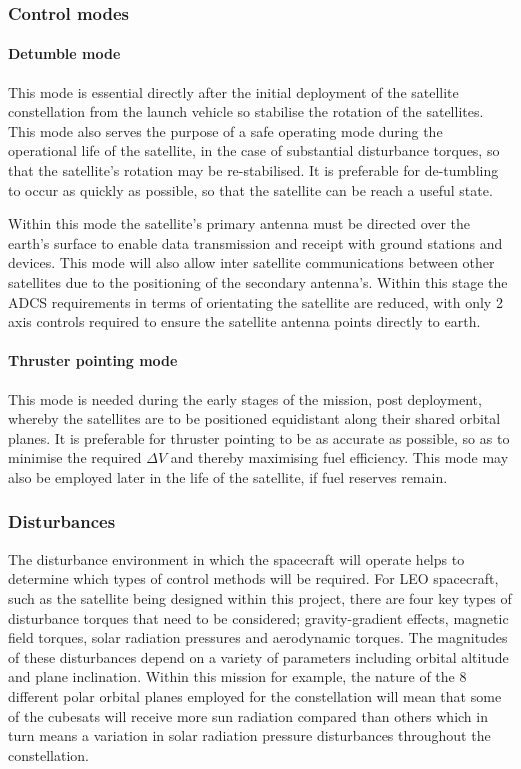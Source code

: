 \subsubsection{Control modes}

\paragraph{Detumble mode}

This mode is essential directly after the initial deployment of the satellite
constellation from the launch vehicle so stabilise the rotation of the satellites.
This mode also serves the purpose of a safe operating mode during the operational
life of the satellite, in the case of substantial disturbance torques, so that
the satellite’s rotation may be re-stabilised. It is preferable for de-tumbling
to occur as quickly as possible, so that the satellite can be reach a useful state.

Within this mode the satellite’s primary antenna must be directed over the earth’s
surface to enable data transmission and receipt with ground stations and devices.
This mode will also allow inter satellite communications between other satellites
due to the positioning of the secondary antenna’s. Within this stage the ADCS
requirements in terms of orientating the satellite are reduced, with only 2 axis
controls required to ensure the satellite antenna points directly to earth.

\paragraph{Thruster pointing mode}

This mode is needed during the early stages of the mission, post deployment,
whereby the satellites are to be positioned equidistant along their shared orbital
planes. It is preferable for thruster pointing to be as accurate as possible, so
as to minimise the required $\Delta V$ and thereby maximising fuel efficiency. This mode
may also be employed later in the life of the satellite, if fuel reserves remain.

\subsubsection{Disturbances}

The disturbance environment in which the spacecraft will operate helps to determine
which types of control methods will be required. For LEO spacecraft, such as the
satellite being designed within this project, there are four key types of
disturbance torques that need to be considered; gravity-gradient effects,
magnetic field torques, solar radiation pressures and aerodynamic torques.
The magnitudes of these disturbances depend on a variety of parameters including
orbital altitude and plane inclination. Within this mission for example,
the nature of the 8 different polar orbital planes employed for the constellation
will mean that some of the cubesats will receive more sun radiation compared than
others which in turn means a variation in solar radiation pressure disturbances
throughout the constellation.

